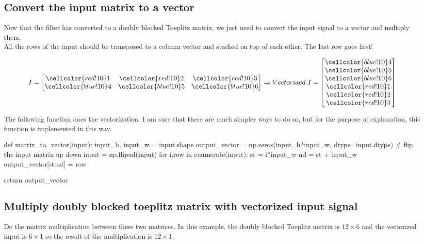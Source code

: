 \documentclass[11pt]{article}
\newcommand\x{\cellcolor{red!10}}
\newcommand\z{\cellcolor{blue!10}}
\begin{document}
	\subsection{Convert the input matrix to a vector}
	Now that the filter has converted to a doubly blocked Toeplitz matrix, we just need to convert the input signal to a vector and multiply them. \\
	All the rows of the input should be transposed to a column vector and stacked on top of each other. The last row goes first!
	
	\begin{equation}
	I = 
	\begin{bmatrix}
	\x 1 & \x 2 & \x 3 \\
	\z 4 & \z 5 & \z 6 \\
	\end{bmatrix}
	\Rightarrow Vectoriaed \  I = 
	\begin{bmatrix}
	\z 4 \\ \z 5 \\ \z 6 \\ \x  1 \\ \x  2 \\ \x  3
	\end{bmatrix}
	\end{equation}
	
	The following function does the vectorization. I am sure that there are much simpler ways to do so, but for the purpose of explanation, this function is implemented in this way.
	
	\vspace{10mm}
	\begin{python}
		def matrix_to_vector(input):
	 	 input_h, input_w = input.shape
		 output_vector = np.zeros(input_h*input_w,
	   	                          dtype=input.dtype)
		 # flip the input matrix up down
		 input = np.flipud(input) 
	 	 for i,row in enumerate(input):
		  st = i*input_w
		  nd = st + input_w
		  output_vector[st:nd] = row
		
		return output_vector
	\end{python}
	\vspace{10mm}
	
	
	\subsection{Multiply doubly blocked toeplitz matrix with vectorized input signal}
	Do the matrix multiplication between these two matrices. In this example, the doubly blocked Toeplitz matrix is $ 12 \times 6$ and the vectorized input is $6 \times 1$ so the result of the multiplication is $12 \times 1$.
	
\end{document}

